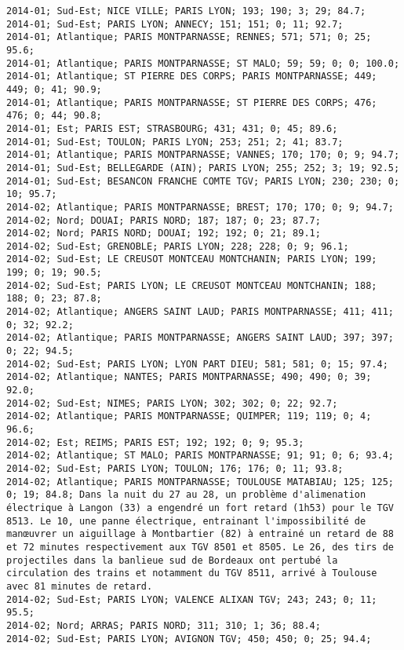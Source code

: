 \documentclass{article}
\begin{document}
\begin{Verbatim}[commandchars=\\\{\}]
2014-01; Sud-Est; NICE VILLE; PARIS LYON; 193; 190; 3; 29; 84.7; 
2014-01; Sud-Est; PARIS LYON; ANNECY; 151; 151; 0; 11; 92.7; 
2014-01; Atlantique; PARIS MONTPARNASSE; RENNES; 571; 571; 0; 25; 95.6; 
2014-01; Atlantique; PARIS MONTPARNASSE; ST MALO; 59; 59; 0; 0; 100.0; 
2014-01; Atlantique; ST PIERRE DES CORPS; PARIS MONTPARNASSE; 449; 449; 0; 41; 90.9; 
2014-01; Atlantique; PARIS MONTPARNASSE; ST PIERRE DES CORPS; 476; 476; 0; 44; 90.8; 
2014-01; Est; PARIS EST; STRASBOURG; 431; 431; 0; 45; 89.6; 
2014-01; Sud-Est; TOULON; PARIS LYON; 253; 251; 2; 41; 83.7; 
2014-01; Atlantique; PARIS MONTPARNASSE; VANNES; 170; 170; 0; 9; 94.7; 
2014-01; Sud-Est; BELLEGARDE (AIN); PARIS LYON; 255; 252; 3; 19; 92.5; 
2014-01; Sud-Est; BESANCON FRANCHE COMTE TGV; PARIS LYON; 230; 230; 0; 10; 95.7; 
2014-02; Atlantique; PARIS MONTPARNASSE; BREST; 170; 170; 0; 9; 94.7; 
2014-02; Nord; DOUAI; PARIS NORD; 187; 187; 0; 23; 87.7; 
2014-02; Nord; PARIS NORD; DOUAI; 192; 192; 0; 21; 89.1; 
2014-02; Sud-Est; GRENOBLE; PARIS LYON; 228; 228; 0; 9; 96.1; 
2014-02; Sud-Est; LE CREUSOT MONTCEAU MONTCHANIN; PARIS LYON; 199; 199; 0; 19; 90.5; 
2014-02; Sud-Est; PARIS LYON; LE CREUSOT MONTCEAU MONTCHANIN; 188; 188; 0; 23; 87.8; 
2014-02; Atlantique; ANGERS SAINT LAUD; PARIS MONTPARNASSE; 411; 411; 0; 32; 92.2; 
2014-02; Atlantique; PARIS MONTPARNASSE; ANGERS SAINT LAUD; 397; 397; 0; 22; 94.5; 
2014-02; Sud-Est; PARIS LYON; LYON PART DIEU; 581; 581; 0; 15; 97.4; 
2014-02; Atlantique; NANTES; PARIS MONTPARNASSE; 490; 490; 0; 39; 92.0; 
2014-02; Sud-Est; NIMES; PARIS LYON; 302; 302; 0; 22; 92.7; 
2014-02; Atlantique; PARIS MONTPARNASSE; QUIMPER; 119; 119; 0; 4; 96.6; 
2014-02; Est; REIMS; PARIS EST; 192; 192; 0; 9; 95.3; 
2014-02; Atlantique; ST MALO; PARIS MONTPARNASSE; 91; 91; 0; 6; 93.4; 
2014-02; Sud-Est; PARIS LYON; TOULON; 176; 176; 0; 11; 93.8; 
2014-02; Atlantique; PARIS MONTPARNASSE; TOULOUSE MATABIAU; 125; 125; 0; 19; 84.8; Dans la nuit du 27 au 28, un problème d'alimenation électrique à Langon (33) a engendré un fort retard (1h53) pour le TGV 8513. Le 10, une panne électrique, entrainant l'impossibilité de manœuvrer un aiguillage à Montbartier (82) à entrainé un retard de 88 et 72 minutes respectivement aux TGV 8501 et 8505. Le 26, des tirs de projectiles dans la banlieue sud de Bordeaux ont pertubé la circulation des trains et notamment du TGV 8511, arrivé à Toulouse avec 81 minutes de retard.
2014-02; Sud-Est; PARIS LYON; VALENCE ALIXAN TGV; 243; 243; 0; 11; 95.5; 
2014-02; Nord; ARRAS; PARIS NORD; 311; 310; 1; 36; 88.4; 
2014-02; Sud-Est; PARIS LYON; AVIGNON TGV; 450; 450; 0; 25; 94.4; 

\end{Verbatim}
\end{document}
